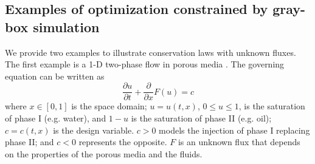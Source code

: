 \documentclass[a4paper,onecolumn]{article}
\theoremstyle{remark}
\begin{document}
\subsection{Examples of optimization constrained by gray-box simulation}
We provide two examples to illustrate conservation laws with unknown fluxes. 
The first example is a 1-D two-phase flow in porous media \cite{Buckley Leverett}. 
The governing equation can be written as
\begin{equation}
    \frac{\partial u}{\partial t} + \frac{\partial }{\partial x} F(u) = c
\end{equation}
where $x\in[0,1]$ is the space domain;
$u = u(t,x)$, $0\le u\le 1$, is the saturation of phase I (e.g. water), 
and $1-u$ is the saturation of phase II (e.g. oil);
$c=c(t,x)$ is the design variable. $c>0$ models the injection of phase I replacing phase II; and $c<0$
represents the opposite.
$F$ is an unknown flux that depends on the properties of the porous media and the fluids.\\
\end{document}

